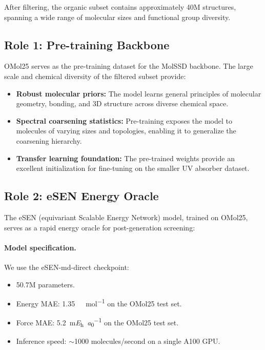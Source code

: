 \documentclass[12pt,a4paper]{article}
\begin{document}
After filtering, the organic subset contains approximately 40M structures, spanning a wide range of molecular sizes and functional group diversity.

\subsection{Role 1: Pre-training Backbone}

OMol25 serves as the pre-training dataset for the MolSSD backbone. The large scale and chemical diversity of the filtered subset provide:
\begin{itemize}
    \item \textbf{Robust molecular priors:} The model learns general principles of molecular geometry, bonding, and 3D structure across diverse chemical space.
    \item \textbf{Spectral coarsening statistics:} Pre-training exposes the model to molecules of varying sizes and topologies, enabling it to generalize the coarsening hierarchy.
    \item \textbf{Transfer learning foundation:} The pre-trained weights provide an excellent initialization for fine-tuning on the smaller UV absorber dataset.
\end{itemize}

\subsection{Role 2: eSEN Energy Oracle}\label{sec:esen}

The eSEN (equivariant Scalable Energy Network) model, trained on OMol25, serves as a rapid energy oracle for post-generation screening:

\paragraph{Model specification.} We use the eSEN-md-direct checkpoint:
\begin{itemize}
    \item 50.7M parameters.
    \item Energy MAE: \SI{1.35}{\kilo\cal\per\mol} on the OMol25 test set.
    \item Force MAE: \SI{5.2}{\milli\hartree\per\bohr} on the OMol25 test set.
    \item Inference speed: $\sim$1000 molecules/second on a single A100 GPU.
\end{itemize}
\end{document}
